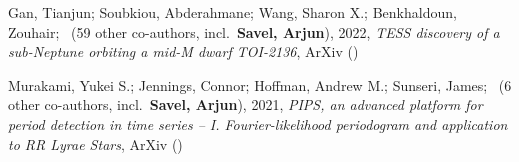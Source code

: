 \item[{\color{numcolor}\scriptsize2}] Gan, Tianjun; Soubkiou, Abderahmane; Wang, Sharon X.; Benkhaldoun, Zouhair; \etal\ ({59} other co-authors, incl.\ \textbf{Savel, Arjun}), 2022, \emph{TESS discovery of a sub-Neptune orbiting a mid-M dwarf TOI-2136}, ArXiv ()

\item[{\color{numcolor}\scriptsize1}] Murakami, Yukei S.; Jennings, Connor; Hoffman, Andrew M.; Sunseri, James; \etal\ ({6} other co-authors, incl.\ \textbf{Savel, Arjun}), 2021, \emph{PIPS, an advanced platform for period detection in time series -- I. Fourier-likelihood periodogram and application to RR Lyrae Stars}, ArXiv ()